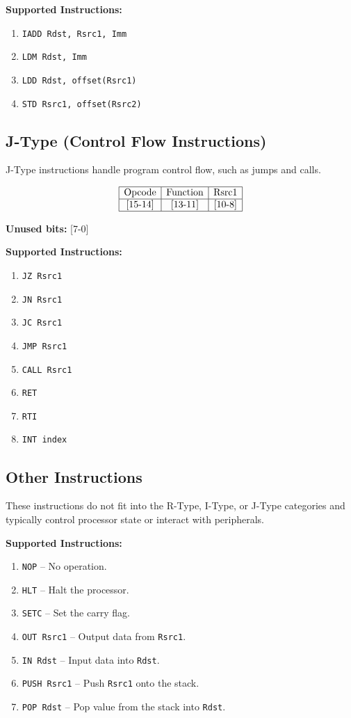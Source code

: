 \documentclass{report}
\begin{document}
\textbf{Supported Instructions:}
\begin{enumerate}
    \item \texttt{IADD Rdst, Rsrc1, Imm}
    \item \texttt{LDM Rdst, Imm}
    \item \texttt{LDD Rdst, offset(Rsrc1)}
    \item \texttt{STD Rsrc1, offset(Rsrc2)}
\end{enumerate}

\subsection*{J-Type (Control Flow Instructions)}
J-Type instructions handle program control flow, such as jumps and calls.

\[
\begin{array}{|c|c|c|}
\hline
\text{Opcode} & \text{Function} & \text{Rsrc1} \\
\hline
\text{[15-14]} & \text{[13-11]} & \text{[10-8]} \\
\hline
\end{array}
\]

\textbf{Unused bits:} [7-0]

\textbf{Supported Instructions:}
\begin{enumerate}
    \item \texttt{JZ Rsrc1}
    \item \texttt{JN Rsrc1}
    \item \texttt{JC Rsrc1}
    \item \texttt{JMP Rsrc1}
    \item \texttt{CALL Rsrc1}
    \item \texttt{RET}
    \item \texttt{RTI}
    \item \texttt{INT index}
\end{enumerate}

\subsection*{Other Instructions}
These instructions do not fit into the R-Type, I-Type, or J-Type categories and typically control processor state or interact with peripherals.

\textbf{Supported Instructions:}
\begin{enumerate}
    \item \texttt{NOP} – No operation.
    \item \texttt{HLT} – Halt the processor.
    \item \texttt{SETC} – Set the carry flag.
    \item \texttt{OUT Rsrc1} – Output data from \texttt{Rsrc1}.
    \item \texttt{IN Rdst} – Input data into \texttt{Rdst}.
    \item \texttt{PUSH Rsrc1} – Push \texttt{Rsrc1} onto the stack.
    \item \texttt{POP Rdst} – Pop value from the stack into \texttt{Rdst}.
\end{enumerate}
\end{document}
